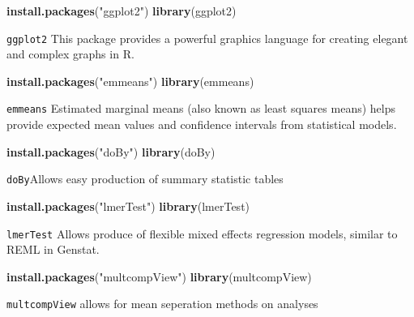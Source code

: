 \documentclass[]{book}
\newenvironment{Shaded}{\begin{snugshade}}{\end{snugshade}}
\newcommand{\KeywordTok}[1]{\textcolor[rgb]{0.13,0.29,0.53}{\textbf{#1}}}
\newcommand{\StringTok}[1]{\textcolor[rgb]{0.31,0.60,0.02}{#1}}
\newcommand{\NormalTok}[1]{#1}
\theoremstyle{definition}
\theoremstyle{definition}
\theoremstyle{definition}
\theoremstyle{remark}
\begin{document}
\begin{Shaded}
\begin{Highlighting}[]
\KeywordTok{install.packages}\NormalTok{(}\StringTok{"ggplot2"}\NormalTok{)}
\KeywordTok{library}\NormalTok{(ggplot2)}
\end{Highlighting}
\end{Shaded}

\texttt{ggplot2} This package provides a powerful graphics language for
creating elegant and complex graphs in R.

\begin{Shaded}
\begin{Highlighting}[]
\KeywordTok{install.packages}\NormalTok{(}\StringTok{"emmeans"}\NormalTok{)}
\KeywordTok{library}\NormalTok{(emmeans)}
\end{Highlighting}
\end{Shaded}

\texttt{emmeans} Estimated marginal means (also known as least squares
means) helps provide expected mean values and confidence intervals from
statistical models.

\begin{Shaded}
\begin{Highlighting}[]
\KeywordTok{install.packages}\NormalTok{(}\StringTok{"doBy"}\NormalTok{)}
\KeywordTok{library}\NormalTok{(doBy)}
\end{Highlighting}
\end{Shaded}

\texttt{doBy}Allows easy production of summary statistic tables

\begin{Shaded}
\begin{Highlighting}[]
\KeywordTok{install.packages}\NormalTok{(}\StringTok{"lmerTest"}\NormalTok{)}
\KeywordTok{library}\NormalTok{(lmerTest)}
\end{Highlighting}
\end{Shaded}

\texttt{lmerTest} Allows produce of flexible mixed effects regression
models, similar to REML in Genstat.

\begin{Shaded}
\begin{Highlighting}[]
\KeywordTok{install.packages}\NormalTok{(}\StringTok{"multcompView"}\NormalTok{)}
\KeywordTok{library}\NormalTok{(multcompView)}
\end{Highlighting}
\end{Shaded}

\texttt{multcompView} allows for mean seperation methods on analyses
\end{document}
